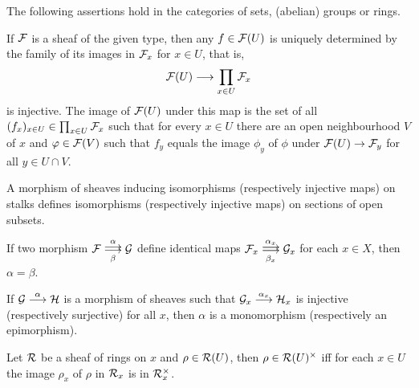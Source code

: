 \documentclass[a4paper,parskip=half,numbers=enddot, DIV=12]{scrreprt}
\begin{document}
\begin{cor}
    The following assertions hold in the categories of sets, (abelian) groups or rings.
    \begin{alphanumerate}
      \item 
        If $\mathcal{F}$ is a sheaf of the given type, then any $f\in\mathcal{F}(U)$ is uniquely determined by the family of its images in $\mathcal{F}_x$ for $x\in U$, that is, 
        \begin{align}\lbl{eq:sheafDefinedByStalks}
            \Ff(U) \morphism \prod_{x\in U} \Ff_x
        \end{align}
        is injective. The image of $\mathcal{F}(U)$ under this map is the set of all $(f_x)_{x\in U}\in\prod_{x\in U}\mathcal{F}_x$ such that for every $x\in U$ there are an open neighbourhood $V$ of $x$ and $\varphi\in \mathcal{F}(V)$ such that $f_y$ equals the image $\phi_y$ of $\phi$ under $\Ff(U)\morphism \Ff_y$ for all $y\in U\cap V$. %
      \item 
        A morphism of sheaves inducing isomorphisms (respectively injective maps) on stalks defines isomorphisms (respectively injective maps) on sections of open subsets. %
      \item 
        If two morphism $\Ff \doublemorphism[\alpha][\beta] \Gg$ define identical maps $\Ff_x \doublemorphism[\alpha_x][\beta_x] \Gg_x$ for each $x\in X$, then $\alpha= \beta$.
      \item
        If $\Gg\morphism[\alpha] \Hh$ is a morphism of sheaves such that $\Gg_x\morphism[\alpha_x] \Hh_x$ is injective (respectively surjective) for all $x$, then $\alpha$ is a monomorphism (respectively an epimorphism). %
      \item
        Let $\mathcal{R}$ be a sheaf of rings on $x$ and $\rho\in\mathcal{R}(U)$, then $\rho\in \mathcal{R}(U)^\times$ iff for each $x\in U$ the image $\rho_x$ of $\rho$ in $\mathcal{R}_x$ is in $\mathcal{R}_x^\times$.
    \end{alphanumerate}
\end{cor}
\end{document}
